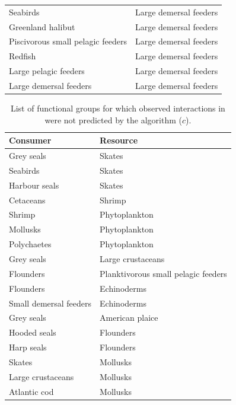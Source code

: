 \begin{singlespace}
\begin{table}[h!]
\begin{tabular}{|l|l|}
    Seabirds                            & Large demersal feeders    \\
    Greenland halibut                   & Large demersal feeders    \\
    Piscivorous small pelagic feeders   & Large demersal feeders    \\
    Redfish                             & Large demersal feeders    \\
    Large pelagic feeders               & Large demersal feeders    \\
    Large demersal feeders              & Large demersal feeders    \\
    \hline
\end{tabular}
\end{table}

\newpage
\begin{table}[h!]
  \caption{List of functional groups for which observed interactions in \citet{savenkoff2004} were not predicted by the algorithm ($c$).}
  \centering
  \begin{tabular}{|l|l|}
    \hline
      Consumer               & Resource \\
    \hline  \hline
    Grey seals             & Skates \\
    Seabirds               & Skates \\
    Harbour seals          & Skates \\
    Cetaceans              & Shrimp \\
    Shrimp                 & Phytoplankton  \\
    Mollusks               & Phytoplankton  \\
    Polychaetes            & Phytoplankton  \\
    Grey seals             & Large crustaceans  \\
    Flounders              & Planktivorous small pelagic feeders    \\
    Flounders              & Echinoderms    \\
    Small demersal feeders & Echinoderms    \\
    Grey seals             & American plaice    \\
    Hooded seals           & Flounders  \\
    Harp seals             & Flounders  \\
    Skates                 & Mollusks   \\
    Large crustaceans      & Mollusks   \\
    Atlantic cod           & Mollusks   \\

\end{tabular}
\end{table}
\end{singlespace}
